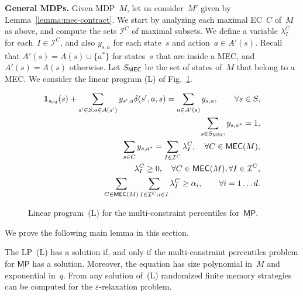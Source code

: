 \documentclass{llncs}
\newcommand{\initState}{\ensuremath{s_{{\sf init}}} }
\newcommand*{\mpinf}{\ensuremath{\underline{\mathsf{MP}}}}
\newcommand\calI{\ensuremath{\mathcal{I}}}
\newcommand\mecs{\ensuremath{\textrm{\sf MEC}}}
\begin{document}
\smallskip\noindent\textbf{General MDPs.} Given MDP~$M$, let us consider~$M'$ given by Lemma~\ref{lemma:mec-contract}.
We start by analyzing each maximal EC~$C$ of~$M$ as above, and compute the sets $\calI^C$ of maximal subsets.
We define a variable $\lambda_I^C$ for each~$I \in \calI^C$, and also $y_{s,a}$ for each state~$s$ and action~$a \in A'(s)$. Recall that
$A'(s) = A(s) \cup\{a^*\}$ for states~$s$ that are inside a MEC, and~$A'(s) = A(s)$ otherwise.
Let $S_{\mecs}$ be the set of states of~$M$ that belong to a MEC.
We consider the linear program (L) of Fig.~\ref{fig:mpinf-lp}.

\vspace{-5mm}
\begin{figure}[th]
	\small
  \begin{align}
    \label{eqn:general-lp}
      \mathbf{1}_{\initState}(s) + \sum_{s' \in S, a \in A(s')}y_{s',a}\delta(s',a,s) = \sum_{a \in A'(s)}y_{s,a}, \qquad \forall s \in S,\\
      \sum_{s \in S_{\text{MEC}}}y_{s,a^*} = 1,\\
      \sum_{s \in C}y_{s,a^*} = \sum_{I \in \calI^C} \lambda_I^C,  \quad \forall C \in \mecs(M), \label{eqn:thirdline}\\
      {\lambda^C_I}\geq 0, \quad \forall C \in \mecs(M), \forall I \in \calI^C, \label{eqn:fourthline}\\
      \sum_{C \in \mecs(M)} \sum_{I \in \calI^C : i \in I} \lambda_I^C \geq \alpha_i, \qquad \forall i=1\ldots d.
      \label{eqn:fifthline}
  \end{align}
\vspace{-2mm}
  \caption{Linear program~(L) for the multi-constraint percentiles for~$\mpinf$.}
  \label{fig:mpinf-lp}
\end{figure}
\vspace{-3mm}

We prove the following main lemma in this section.

\begin{lemma}
  \label{lemma:mpinf-lp}
  The LP~(L) has a solution if, and only if the multi-constraint percentiles problem for $\mpinf$ has a solution. Moreover, the equation has size polynomial in~$M$ and exponential in~$q$.
  From any solution of~(L) randomized finite memory strategies can be computed for the $\varepsilon$-relaxation problem.
\end{lemma}
\end{document}
